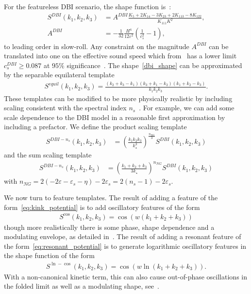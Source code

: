 For the featureless DBI scenario, the shape function is~\cite{dbi_in_the_sky}:
\begin{align}\label{dbi_shape}
    S^{DBI}(k_1,k_2,k_3) &= A^{DBI}\frac{K_5+2K_{14}-3K_{23}+2K_{113}-8K_{122}}{K_{111}K^2},\\
    A^{DBI} &= -\frac{1}{32}\frac{H^4}{12\varepsilon^2}\left(\frac{1}{c_s^2}-1\right),
\end{align}
to leading order in slow-roll.
Any constraint on the magnitude $A^{DBI}$ can be translated into one 
on the effective sound speed which from \planck~has a lower limit $c_s^{DBI} \geq 0.087$
at $95\%$ significance~\cite{Planck_NG_2015}.
The shape~\eqref{dbi_shape} can be approximated by the separable equilateral template
\begin{align}\label{equil_shape}
    S^{equil}(k_1,k_2,k_3) = \frac{(k_2+k_3-k_1)(k_3+k_1-k_2)(k_1+k_2-k_3)}{k_1k_2k_3}.
\end{align}
These templates can be modified to be more physically realistic by including
scaling consistent with the spectral index $n_s$~\cite{Planck_NG_2015}.
For example, we can add some scale dependence to the DBI model in a reasonable first approximation by including a prefactor. We define the product scaling template
\begin{align}\label{dbi_prod_shape}
    S^{DBI-n_s}(k_1,k_2,k_3) &= {\left(\frac{k_1k_2k_3}{k^3_\star}\right)}^{\frac{n_{NG}}{3}}S^{DBI}(k_1,k_2,k_3)
\end{align}
and the sum scaling template
\begin{align}\label{dbi_sum_shape}
    S^{DBI-n_s}(k_1,k_2,k_3) &= {\left(\frac{k_1+k_2+k_3}{3k_\star}\right)}^{n_{NG}}S^{DBI}(k_1,k_2,k_3)
\end{align}
with $n_{NG}=2(-2\varepsilon-\varepsilon_s-\eta)-2\varepsilon_s=2(n_s-1)-2\varepsilon_s$.

We now turn to feature templates.
The result of adding a feature of the form~\eqref{eq:kink_potential}
is to add oscillatory features of the form
\begin{align}\label{cos_shape}
    S^{\cos}(k_1,k_2,k_3) = \cos(w(k_1+k_2+k_3))
\end{align}
though more realistically there is some phase, shape dependence and a modulating envelope,
as detailed in~\cite{adshead}.
The result of adding a resonant feature of the form~\eqref{eq:resonant_potential}
is to generate logarithmic oscillatory features in the shape function of the form
\begin{align}\label{ln_cos_shape}
    S^{\ln-\cos}(k_1,k_2,k_3) = \cos(w\ln(k_1+k_2+k_3)).
\end{align}
With a non-canonical kinetic term, this can also
cause out-of-phase oscillations in the folded limit as well as a modulating shape,
see~\cite{chen_folded_resonant}.


